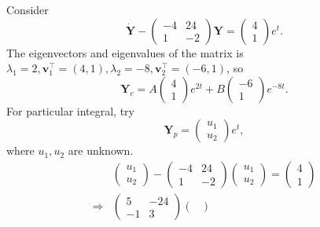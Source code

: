 \documentclass[a4paper]{article}
\begin{document}
    \begin{example}
        Consider 
        \[
            \dot{\mathbf{Y}}-\begin{pmatrix}
                -4&24\\
                1&-2
            \end{pmatrix}\mathbf{Y} = \begin{pmatrix}
                4\\1
            \end{pmatrix}e^t.
        \]
        The eigenvectors and eigenvalues of the matrix is $ \lambda_1=2, \mathbf{v}_1^{\top} = (4,1), \lambda_2 =-8, \mathbf{v}_2^\top =(-6,1) $, so
        \[
            \mathbf{Y}_c = A\begin{pmatrix}
                4\\1
            \end{pmatrix}e^{2t}+B\begin{pmatrix}
                -6\\1
            \end{pmatrix}e^{-8t}.
        \]
        For particular integral, try 
        \[
            \mathbf{Y}_p = \begin{pmatrix}
                u_1\\u_2
            \end{pmatrix}e^{t},
        \]
        where $u_1,u_2$ are unknown. 
        \begin{align*}
            &\begin{pmatrix}
                u_1\\u_2
            \end{pmatrix}-\begin{pmatrix}
                -4&24\\
                1&-2
            \end{pmatrix}\begin{pmatrix}
                u_1\\u_2
            \end{pmatrix} = \begin{pmatrix}
                4\\1
            \end{pmatrix}\\
            \Longrightarrow & \begin{pmatrix}
                5&-24\\
                -1&3
            \end{pmatrix}\begin{pmatrix}

\end{pmatrix}
\end{align*}
\end{example}
\end{document}
